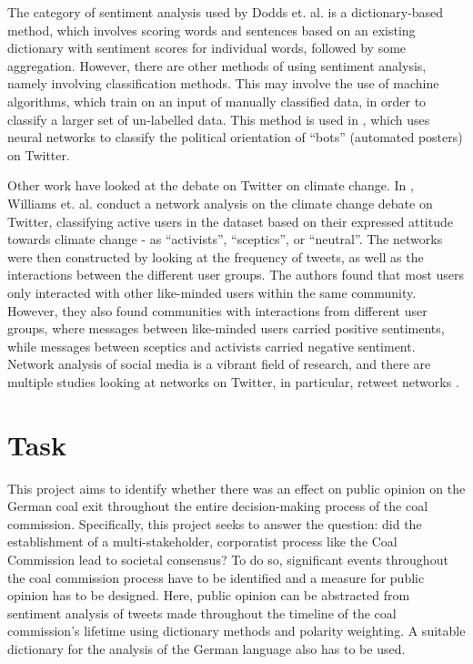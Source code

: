 \documentclass[12pt,onecolumn,twoside]{layout}
\begin{document}
The category of sentiment analysis used by Dodds et. al. is a dictionary-based method, which involves scoring words and sentences based on an existing dictionary with sentiment scores for individual words, followed by some aggregation. However, there are other methods of using sentiment analysis, namely involving classification methods. This may involve the use of machine algorithms, which train on an input of manually classified data, in order to classify a larger set of un-labelled data. This method is used in \cite{Stukal2019}, which uses neural networks to classify the political orientation of ``bots'' (automated posters) on Twitter. 

Other work have looked at the debate on Twitter on climate change. In \cite{Williams2015}, Williams et. al. conduct a network analysis on the climate change debate on Twitter, classifying active users in the dataset based on their expressed attitude towards climate change - as ``activists'', ``sceptics'', or ``neutral''. The networks were then constructed by looking at the frequency of tweets, as well as the interactions between the different user groups. The authors found that most users only interacted with other like-minded users within the same community. However, they also found communities with interactions from different user groups, where messages between like-minded users carried positive sentiments, while messages between sceptics and activists carried negative sentiment. Network analysis of social media is a vibrant field of research, and there are multiple studies looking at networks on Twitter, in particular, retweet networks \cite{Cherepnalkoski2016}. 

\section*{Task} \label{sec:task}
This project aims to identify whether there was an effect on public opinion on the German coal exit throughout the entire decision-making process of the coal commission. Specifically, this project seeks to answer the question: did the establishment of a multi-stakeholder, corporatist process like the Coal Commission lead to societal consensus? To do so, significant events throughout the coal commission process have to be identified and a measure for public opinion has to be designed. Here, public opinion can be abstracted from sentiment analysis of tweets made throughout the timeline of the coal commission's lifetime using dictionary methods and polarity weighting. A suitable dictionary for the analysis of the German language also has to be used. 
\end{document}
